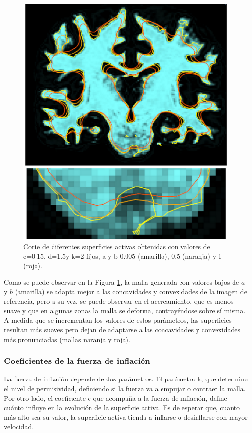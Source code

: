 \begin{figure}[h!]
	\centering
	\includegraphics[scale=0.05]{images/sensibilidad4.jpg}
	\caption{Corte de diferentes superficies activas obtenidas con valores de c=0.15, d=1.5y k=2 fijos, a y b 0.005 (amarillo), 0.5 (naranja) y 1 (rojo). }
	\label{fig:sensibilidad4}
\end{figure}

Como se puede observar en la Figura \ref{fig:sensibilidad4}, la malla generada con valores bajos de $a$ y $b$ (amarilla) se adapta mejor a las concavidades y convexidades de la imagen de referencia, pero a su vez, se puede observar en el acercamiento, que es menos suave y que en algunas zonas la malla se deforma, contrayéndose sobre sí misma. A medida que se incrementan los valores de estos parámetros, las superficies resultan más suaves pero dejan de adaptarse a las concavidades y convexidades más pronunciadas (mallas naranja y roja). 

\subsubsection{Coeficientes de la fuerza de inflación}
La fuerza de inflación depende de dos parámetros. El parámetro k, que determina el nivel de permisividad, definiendo si la fuerza va a empujar o contraer la malla. Por otro lado,  el coeficiente c que acompaña a la fuerza de inflación, define  cuánto influye en la evolución de la superficie activa. Es de esperar que, cuanto más alto sea su valor, la superficie activa tienda a inflarse o desinflarse con mayor velocidad.

